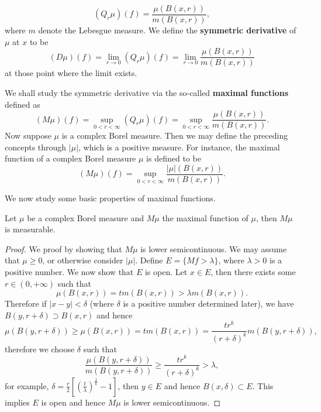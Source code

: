 $$
\left( Q_r\mu \right) \left( f \right) =\frac{\mu \left( B\left( x,r \right) \right)}{m\left( B\left( x,r \right) \right)},
$$
where $m$ denote the Lebesgue measure. We define the \textbf{symmetric derivative} of $\mu$ at $x$ to be 
$$
\left( D\mu \right) \left( f \right) =\lim_{r\rightarrow 0} \left( Q_r\mu \right) \left( f \right) =\lim_{r\rightarrow 0} \frac{\mu \left( B\left( x,r \right) \right)}{m\left( B\left( x,r \right) \right)}
$$
at those point where the limit exists.\par
We shall study the symmetric derivative via the so-called \textbf{maximal functions} defined as 
$$
\left( M\mu \right) \left( f \right) =\mathop {\mathrm{sup}} \limits_{0<r<\infty}\left( Q_r\mu \right) \left( f \right) =\mathop {\mathrm{sup}} \limits_{0<r<\infty}\frac{\mu \left( B\left( x,r \right) \right)}{m\left( B\left( x,r \right) \right)}.
$$
Now suppose $\mu$ is a complex Borel measure. Then we may define the preceding concepts through $|\mu|$, which is a positive measure. For instance, the maximal function of a complex Borel measure $\mu$ is defined to be 
$$
\left( M\mu \right) \left( f \right) =\mathop {\mathrm{sup}} \limits_{0<r<\infty}\frac{\left| \mu \right|\left( B\left( x,r \right) \right)}{m\left( B\left( x,r \right) \right)}.
$$\par
We now study some basic properties of maximal functions.
\begin{theorem}
Let $\mu$ be a complex Borel measure and $M\mu$ the maximal function of $\mu$, then $M\mu$ is measurable.
\end{theorem}
\begin{proof}
We proof by showing that $M\mu$ is lower semicontinuous. We may assume that $\mu\ge 0$, or otherwise consider $|\mu|$. Define $E=\{Mf>\lambda\}$, where $\lambda>0$ is a positive number. We now show that $E$ is open. Let $x\in E$, then there exists some $r\in(0,+\infty)$ such that 
$$
\mu \left( B\left( x,r \right) \right) =tm\left( B\left( x,r \right) \right) >\lambda m\left( B\left( x,r \right) \right) .
$$
Therefore if $|x-y|<\delta$ (where $\delta$ is a positive number determined later), we have $B(y,r+\delta)\supset B(x,r)$ and hence 
$$
\mu \left( B\left( y,r+\delta \right) \right) \ge \mu \left( B\left( x,r \right) \right) =tm\left( B\left( x,r \right) \right) =\frac{tr^k}{\left( r+\delta \right) ^k}m\left( B\left( y,r+\delta \right) \right) ,
$$
therefore we choose $\delta$ such that 
$$
\frac{\mu \left( B\left( y,r+\delta \right) \right)}{m\left( B\left( y,r+\delta \right) \right)}\ge \frac{tr^k}{\left( r+\delta \right) ^k}>\lambda ,
$$
for example, $\delta =\frac{r}{2}\left[ \left( \frac{t}{\lambda} \right) ^{\frac{1}{k}}-1 \right] $, then $y\in E$ and hence $B(x,\delta)\subset E$. This implies $E$ is open and hence $M\mu$ is lower semicontinuous.
\end{proof}
